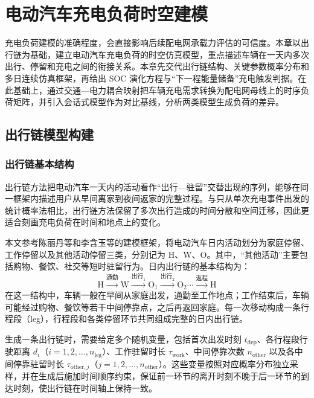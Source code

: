 \documentclass[10pt,a4paper]{article}
\numberwithin{equation}{section}
\numberwithin{table}{section}
\numberwithin{figure}{section}
\begin{document}
    \clearpage
    \section{电动汽车充电负荷时空建模}

    充电负荷建模的准确程度，会直接影响后续配电网承载力评估的可信度。本章以出行链为基础，建立电动汽车充电负荷的时空仿真模型，重点描述车辆在一天内多次出行、停留和充电之间的衔接关系。本章先交代出行链结构、关键参数概率分布和多日连续仿真框架，再给出 SOC 演化方程与“下一程能量储备”充电触发判据。在此基础上，通过交通—电力耦合映射把车辆充电需求转换为配电网母线上的时序负荷矩阵，并引入会话式模型作为对比基线，分析两类模型生成负荷的差异。

    \subsection{出行链模型构建}

    \subsubsection{出行链基本结构}

    出行链方法把电动汽车一天内的活动看作“出行—驻留”交替出现的序列，能够在同一框架内描述用户从早间离家到夜间返家的完整过程。与只从单次充电事件出发的统计概率法相比，出行链方法保留了多次出行造成的时间分散和空间迁移，因此更适合刻画充电负荷在时间和地点上的变化\supercite{ref9}。

    本文参考陈丽丹等\supercite{ref9}和李含玉等\supercite{ref10}的建模框架，将电动汽车日内活动划分为家庭停留、工作停留以及其他活动停留三类，分别记为 H、W、O。其中，“其他活动”主要包括购物、餐饮、社交等短时驻留行为。日内出行链的基本结构为：
    \begin{equation}
    \label{eq:tripchain_structure}
    \text{H} \xrightarrow{\text{通勤}} \text{W} \xrightarrow{\text{出行}_1} \text{O}_1 \xrightarrow{\text{出行}_2} \text{O}_2 \cdots \xrightarrow{\text{返程}} \text{H}
    \end{equation}
    在这一结构中，车辆一般在早间从家庭出发，通勤至工作地点；工作结束后，车辆可能经过购物、餐饮等若干中间停靠点，之后再返回家庭。每一次移动构成一条行程段（leg），行程段和各类停留环节共同组成完整的日内出行链。

    生成一条出行链时，需要给定多个随机变量，包括首次出发时刻 $t_{\text{dep}}$、各行程段行驶距离 $d_i$（$i=1,2,\ldots,n_{\text{leg}}$）、工作驻留时长 $\tau_{\text{work}}$、中间停靠次数 $n_{\text{other}}$ 以及各中间停靠驻留时长 $\tau_{\text{other},j}$（$j=1,2,\ldots,n_{\text{other}}$）。这些变量按照对应概率分布独立采样，并在生成后施加时间顺序约束，保证前一环节的离开时刻不晚于后一环节的到达时刻，使出行链在时间轴上保持一致。
\end{document}
